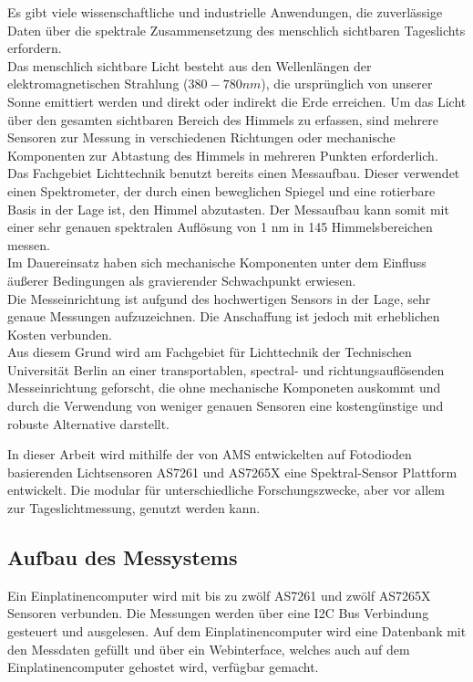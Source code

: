 Es gibt viele wissenschaftliche und industrielle Anwendungen, die zuverlässige Daten über die spektrale Zusammensetzung des menschlich sichtbaren Tageslichts erfordern.\\
Das menschlich sichtbare Licht besteht aus den Wellenlängen der elektromagnetischen Strahlung ($380 - 780 nm$), die ursprünglich von unserer Sonne emittiert werden und direkt oder indirekt die Erde erreichen.
Um das Licht über den gesamten sichtbaren Bereich des Himmels zu erfassen, sind mehrere Sensoren zur Messung in verschiedenen Richtungen oder mechanische Komponenten zur Abtastung des Himmels in mehreren Punkten erforderlich.\\
Das Fachgebiet Lichttechnik benutzt bereits einen Messaufbau. Dieser verwendet einen Spektrometer, der durch einen beweglichen Spiegel und eine rotierbare Basis in der Lage ist, den Himmel abzutasten. 
Der Messaufbau kann somit mit einer sehr genauen spektralen Auflösung von 1 nm in 145 Himmelsbereichen messen.\\
Im Dauereinsatz haben sich mechanische Komponenten unter dem Einfluss äußerer Bedingungen als gravierender Schwachpunkt erwiesen.\\
 Die Messeinrichtung ist aufgund des hochwertigen Sensors in der Lage, sehr genaue Messungen aufzuzeichnen. Die Anschaffung ist jedoch mit erheblichen Kosten verbunden.\\
Aus diesem Grund wird am Fachgebiet für Lichttechnik der Technischen Universität Berlin an einer transportablen, spectral- und richtungsauflösenden Messeinrichtung geforscht, die ohne mechanische Komponeten auskommt und durch die Verwendung von weniger genauen Sensoren eine kostengünstige und robuste Alternative darstellt.

\noindent In dieser Arbeit wird mithilfe der von AMS entwickelten auf Fotodioden basierenden Lichtsensoren  AS7261 und AS7265X eine Spektral-Sensor Plattform entwickelt. Die modular für unterschiedliche Forschungszwecke, aber vor allem zur Tageslichtmessung, genutzt werden kann.


\subsection{Aufbau des Messystems}
Ein Einplatinencomputer wird mit bis zu zwölf AS7261 und zwölf AS7265X Sensoren verbunden.
Die Messungen werden über eine I2C Bus Verbindung gesteuert und ausgelesen.
Auf dem Einplatinencomputer  wird eine Datenbank mit den Messdaten gefüllt und über ein Webinterface, welches auch auf dem Einplatinencomputer gehostet wird, verfügbar gemacht.
